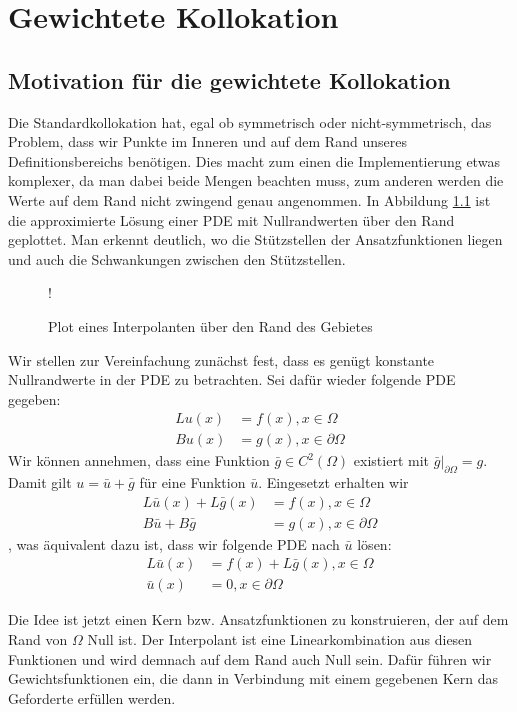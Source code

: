 \chapter{Gewichtete Kollokation}
\label{cha:Gewichtet}
\section{Motivation für die gewichtete Kollokation}
Die Standardkollokation hat, egal ob symmetrisch oder nicht-symmetrisch, das Problem, dass wir Punkte im Inneren und auf dem Rand unseres Definitionsbereichs benötigen. Dies macht zum einen die Implementierung etwas komplexer, da man dabei beide Mengen beachten muss, zum anderen werden die Werte auf dem Rand nicht zwingend genau angenommen. In Abbildung \ref{fig:rand} ist die approximierte Lösung einer \ac{PDE} mit Nullrandwerten über den Rand geplottet. Man erkennt deutlich, wo die Stützstellen der Ansatzfunktionen liegen und auch die Schwankungen zwischen den Stützstellen.
\begin{figure}[h]
\centering
\resizebox {\columnwidth} {!} {

}
\caption{Plot eines Interpolanten über den Rand des Gebietes}
\label{fig:rand}
\end{figure}

Wir stellen zur Vereinfachung zunächst fest, dass es genügt konstante Nullrandwerte in der \ac{PDE} zu betrachten. Sei dafür wieder folgende \ac{PDE} gegeben:
\begin{align*}
Lu(x) &= f(x), x\in \Omega\\
Bu(x) &= g(x), x \in \partial \Omega
\end{align*}
Wir können annehmen, dass eine Funktion $\bar{g} \in C^2(\Omega)$ existiert mit $\bar{g}|_{\partial \Omega} = g$. Damit gilt $u = \bar{u} + \bar{g}$ für eine Funktion $\bar{u}$. Eingesetzt erhalten wir
\begin{align*}
L\bar{u}(x) + L\bar{g}(x) &= f(x) , x \in \Omega\\
B\bar{u} + B\bar{g} &= g(x) , x \in \partial \Omega
\end{align*}
, was äquivalent dazu ist, dass wir folgende \ac{PDE} nach $\bar{u}$ lösen:
\begin{align*}
L\bar{u}(x) &= f(x) + L\bar{g}(x), x \in \Omega\\
\bar{u}(x) &= 0, x \in \partial \Omega
\end{align*}

Die Idee ist jetzt einen Kern bzw. Ansatzfunktionen zu konstruieren, der auf dem Rand von $\Omega$ Null ist. Der Interpolant ist eine Linearkombination aus diesen Funktionen und wird demnach auf dem Rand auch Null sein. Dafür führen wir Gewichtsfunktionen ein, die dann in Verbindung mit einem gegebenen Kern das Geforderte erfüllen werden.
